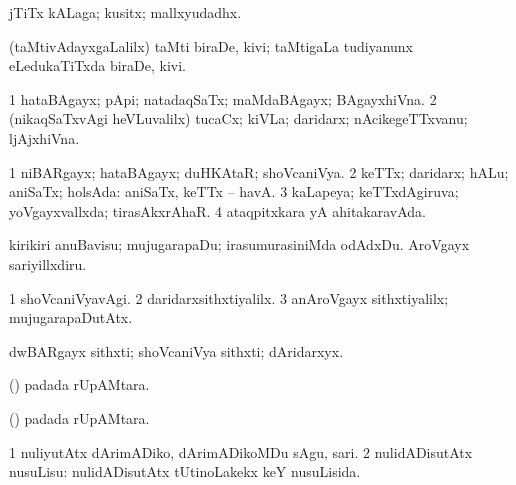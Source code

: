 {{{{{{\begin{center}
{{\bentry
{} 
\gl{\nA}
\expl{}
\bmng
jTiTx kALaga; kusitx; mallxyudadhx. 
\emng
\eentry

\bentry
{} 
\gl{\nA}
\expl{}
\bmng
(taMtivAdayxgaLalilx) taMti biraDe, kivi; taMtigaLa tudiyanunx eLedukaTiTxda biraDe, kivi. 
\emng
\eentry

\bentry
{} 
\gl{\nA}
\expl{}
\bmng
{} 
\emng
\eentry

\bentry
{} 
\gl{\nA}
\expl{}
\bmng
\bnum
\num{1} hataBAgayx; pApi; natadaqSaTx; maMdaBAgayx; BAgayxhiVna. 
\num{2} (nikaqSaTxvAgi heVLuvalilx) tucaCx; kiVLa; daridarx; nAcikegeTTxvanu; ljAjxhiVna. 
\enum
\emng
\eentry

\bentry
{} 
\gl{\gu}
\bmng
\bnum
\num{1} niBARgayx; hataBAgayx; duHKAtaR; shoVcaniVya. 
\num{2} keTTx; daridarx; hALu; aniSaTx; holsAda:  aniSaTx, keTTx -- havA. 
\num{3} kaLapeya; keTTxdAgiruva; yoVgayxvallxda; tirasAkxrAhaR. 
\num{4} ataqpitxkara yA ahitakaravAda. 
\enum
\emng

\noindent
\gl{\pagu}
\expl{}
\bmng
{} 
\banum
{} kirikiri anuBavisu; mujugarapaDu; irasumurasiniMda odAdxDu. 
 AroVgayx sariyillxdiru. 
\eanum
\emng
\eentry

\bentry
{} 
\gl{\kirxvi}
\expl{}
\bmng
\bnum
\num{1} shoVcaniVyavAgi. 
\num{2} daridarxsithxtiyalilx. 
\num{3} anAroVgayx sithxtiyalilx; mujugarapaDutAtx. 
\enum
\emng
\eentry

\bentry
{} 
\gl{\nA}
\expl{}
\bmng
dwBARgayx sithxti; shoVcaniVya sithxti; dAridarxyx. 
\emng
\eentry

\bentry
{} 
\gl{\nA}
\bmng
(\birx)  padada rUpAMtara. 
\emng
\eentry

\bentry
{} 
\gl{\sakirx}
\expl{}
\bmng
(\birx)  padada rUpAMtara. 
\emng
\eentry

\bentry
{} 
\gl{\sakirx}
\expl{}
\bmng
\bnum
\num{1} nuliyutAtx dArimADiko, dArimADikoMDu sAgu, sari. 
\num{2} nulidADisutAtx nusuLisu:  nulidADisutAtx tUtinoLakekx keY nusuLisida. 
\enum
\emng

}}
\end{center}}}}}}}

